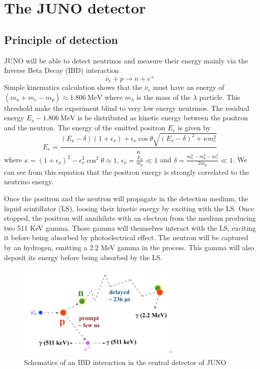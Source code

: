\section{The JUNO detector}


\subsection{Principle of detection}

JUNO will be able to detect neutrinos and measure their energy mainly via the Inverse Beta Decay (IBD) interaction
\begin{equation*}
  \bar{\nu}_e + p \rightarrow n + e^+
\end{equation*}
Simple kinematics calculation shows that the $\bar{\nu}_e$ must have an energy of $ (m_n + m_e - m_p ) \approx 1.806 ~ \mathrm{MeV}$ \cite{strumia_precise_2003} where $m_\lambda$ is the mass of the $\lambda$ particle.
This threshold make the experiment blind to very low energy neutrinos. The residual energy $E_{\nu} - 1.806 ~ \mathrm{MeV}$ is be distributed as kinetic energy between the positron and the neutron.
The energy of the emitted positron $E_e$ is given by \cite{strumia_precise_2003}
\begin{equation}
  E_e = \frac{(E_\nu - \delta)(1+\epsilon_\nu) + \epsilon_\nu \cos \theta \sqrt{(E_\nu - \delta)^2 + \kappa m_e^2}}{\kappa}
\end{equation}
where $\kappa = (1 + \epsilon_\nu)^2 - \epsilon_\nu^2 \cos^2 \theta \approx 1$, $\epsilon_\nu = \frac{E_\nu}{m_p} \ll 1$ and $\delta = \frac{m_n^2 - m_p^2 - m_e^2}{2m_p} \ll 1$.
We can see from this equation that the positron energy is strongly correlated to the neutrino energy.

Once the positron and the neutron will propagate in the detection medium, the liquid scintillator (LS), loosing their kinetic energy by exciting with the LS. Once stopped, the positron will annihilate with an electron from the medium producing two 511 KeV gamma. Those gamma will themselves interact with the LS, exciting it before being absorbed by photoelectrical effect. The neutron will be captured by an hydrogen, emitting a 2.2 MeV gamma in the process. This gamma will also deposit its energy before being absorbed by the LS.

\begin{figure}[ht]
  \centering
  \includegraphics[width=8cm]{images/juno/IDB-JUNO.png}
  \caption{Schematics of an IBD interaction in the central detector of JUNO}
  \label{fig:IBD}
\end{figure}

